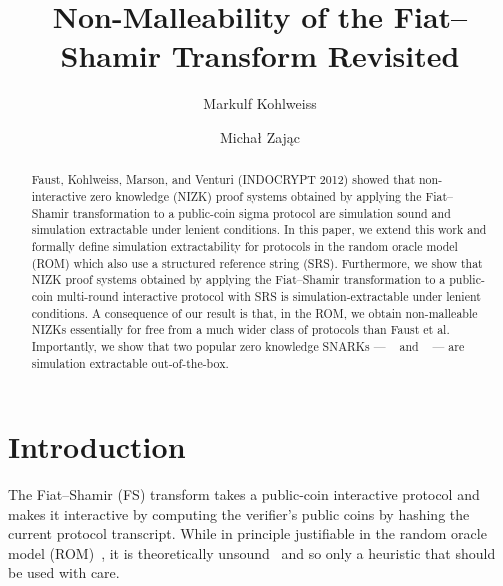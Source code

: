 \documentclass[runningheads,11pt]{llncs}
\title{Non-Malleability of the Fiat--Shamir Transform Revisited}
\author{Markulf Kohlweiss\inst{1,2} \and Michał Zając\inst{3}}
\institute{University of Edinburgh, Edinburgh, UK \and IOHK \\
\email{mkohlwei@inf.ed.ac.uk} \and Clearmatics, London, UK \\
\email{m.p.zajac@gmail.com}}
\begin{document}
 \sloppy \maketitle

\begin{abstract}
  Faust, Kohlweiss, Marson, and Venturi (INDOCRYPT 2012) showed that  non-interactive zero knowledge (NIZK) proof systems obtained by applying the
  Fiat--Shamir transformation to a public-coin sigma protocol are
  simulation sound and simulation extractable under lenient conditions. In this
  paper, we extend this work and formally define
  simulation extractability for protocols in the random oracle model (ROM) which also use a structured reference string (SRS). Furthermore, we show that NIZK
  proof systems obtained by applying the Fiat--Shamir transformation to a
  public-coin multi-round interactive protocol with SRS is
  simulation-extractable under lenient conditions. A consequence of our result
  is that, in the ROM, we obtain non-malleable NIZKs essentially for free from a
  much wider class of protocols than Faust et al. Importantly, we show that two
  popular zero knowledge SNARKs --- \plonk{}~\cite{EPRINT:GabWilCio19} and
  \sonic{}~\cite{CCS:MBKM19} --- are simulation extractable out-of-the-box.
\end{abstract}

\section{Introduction}
The Fiat--Shamir (FS) transform takes a public-coin interactive protocol and makes it
interactive by computing the verifier's public coins by hashing the current
protocol transcript. While in principle justifiable in the random oracle model
(ROM)~\cite{CCS:BelRog93}, it is theoretically unsound~\cite{FOCS:GolKal03} and
so only a heuristic that should be used with care.
\end{document}
